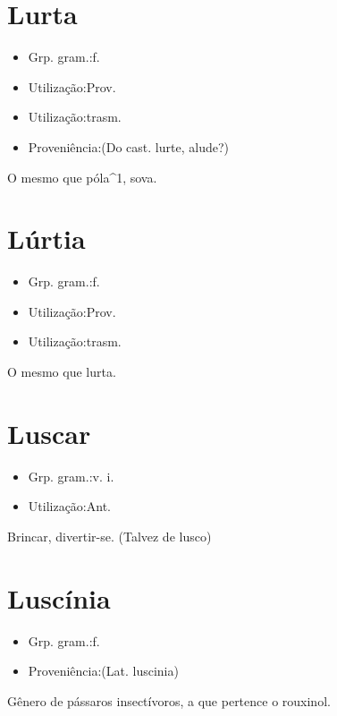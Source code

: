 \section{Lurta}
\begin{itemize}
\item {Grp. gram.:f.}
\end{itemize}
\begin{itemize}
\item {Utilização:Prov.}
\end{itemize}
\begin{itemize}
\item {Utilização:trasm.}
\end{itemize}
\begin{itemize}
\item {Proveniência:(Do cast. \textunderscore lurte\textunderscore , alude?)}
\end{itemize}
O mesmo que \textunderscore póla\textunderscore ^1, sova.
\section{Lúrtia}
\begin{itemize}
\item {Grp. gram.:f.}
\end{itemize}
\begin{itemize}
\item {Utilização:Prov.}
\end{itemize}
\begin{itemize}
\item {Utilização:trasm.}
\end{itemize}
O mesmo que \textunderscore lurta\textunderscore .
\section{Luscar}
\begin{itemize}
\item {Grp. gram.:v. i.}
\end{itemize}
\begin{itemize}
\item {Utilização:Ant.}
\end{itemize}
Brincar, divertir-se.
(Talvez de \textunderscore lusco\textunderscore )
\section{Luscínia}
\begin{itemize}
\item {Grp. gram.:f.}
\end{itemize}
\begin{itemize}
\item {Proveniência:(Lat. \textunderscore luscinia\textunderscore )}
\end{itemize}
Gênero de pássaros insectívoros, a que pertence o rouxinol.
